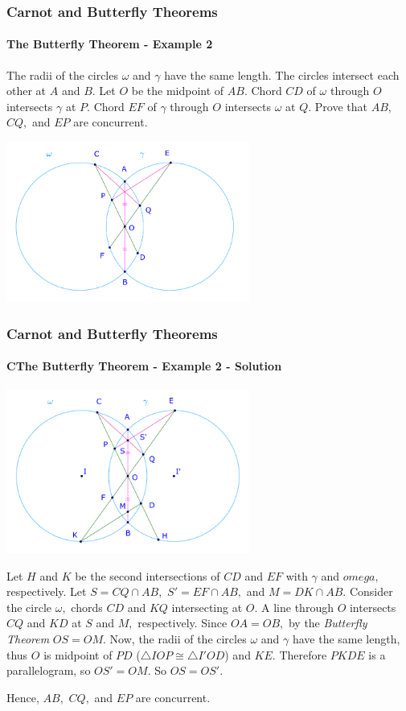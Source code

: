 \documentclass[8pt,xcolor=table,dvipsnames]{beamer}
\begin{document}
\begin{frame}[t]
    \frametitle{Carnot and Butterfly Theorems}
    \framesubtitle{The Butterfly Theorem - Example 2}
    \begin{example}
        The radii of the circles $\omega$ and $\gamma$ have the same length. The circles intersect each other at $A$ and $B.$
        Let $O$ be the midpoint of $AB.$ Chord $CD$ of $\omega$ through $O$ intersects $\gamma$ at $P.$
        Chord $EF$ of $\gamma$ through $O$ intersects $\omega$ at $Q.$
        Prove that $AB,$ $CQ,$ and $EP$ are concurrent.
    \end{example}

    \bigbreak
    \begin{center}
        \includegraphics[width=8cm]{./svg/pdf/24-25-s2-g3-p6.pdf}
    \end{center}
\end{frame}

\begin{frame}[t]
    \frametitle{Carnot and Butterfly Theorems}
    \framesubtitle{CThe Butterfly Theorem - Example 2 - Solution}
    \begin{center}
        \includegraphics[width=8cm]{./svg/pdf/24-25-s2-g3-p6-2.pdf}
    \end{center}
    \begin{overprint}
        Let $H$ and $K$ be the second intersections of $CD$ and $EF$ with $\gamma$ and $omega,$ respectively.
        Let $S = CQ \cap AB,$ $S' = EF \cap AB,$ and $M = DK \cap AB.$
        Consider the circle $\omega,$ chords $CD$ and $KQ$ intersecting at $O.$ A line through $O$ intersects $CQ$ and $KD$ at $S$ and $M,$ respectively.
        Since $OA = OB,$ by the \textit{Butterfly Theorem} $OS = OM.$ 
        Now, the radii of the circles $\omega$ and $\gamma$ have the same length,
        thus $O$ is midpoint of $PD$ ($\triangle IOP \cong \triangle I'OD$) and $KE.$
        Therefore $PKDE$ is a parallelogram, so $OS' = OM.$ So $OS = OS'.$
        
        Hence, $AB,$ $CQ,$ and $EP$ are concurrent.
    \end{overprint}        
\end{frame}
\end{document}
